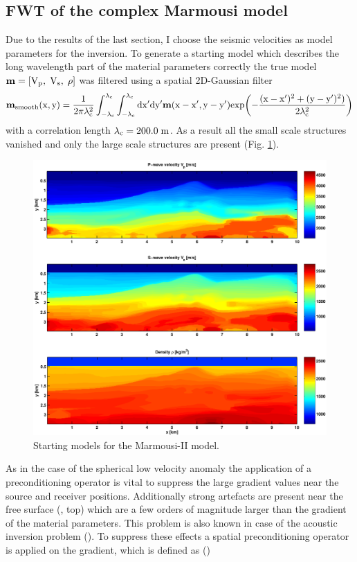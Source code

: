 \subsection{FWT of the complex Marmousi model}
\label{marmousi_complex_FWT}   
Due to the results of the last section, I choose the seismic velocities as model parameters for the inversion. To generate a starting model which describes the long wavelength part of the material parameters correctly the true model $\rm{\mathbf{m}=[V_p,\;V_s,\;\rho]}$ was filtered using a spatial 2D-Gaussian filter 
\begin{equation}
\rm{\mathbf{m}_{smooth}(x,y) = \frac{1}{2 \pi \lambda_c^2} \int_{-\lambda_c}^{\lambda_c} \int_{-\lambda_c}^{\lambda_c} dx' dy' \mathbf{m}(x-x',y-y') exp\biggl(-\frac{(x-x')^2+(y-y')^2)}{2 \lambda_c^2}\biggr)}
\label{gaussian}
\end{equation}
with a correlation length $\rm{\lambda_c = 200.0\;m}$. As a result all the small scale structures vanished and only the large scale structures are present (Fig. \ref{marmousi_II_start}). 
\begin{figure}[!bth]
\begin{center}
\includegraphics[width=12cm]{figures/marmousi/marmousi_II_start.pdf}
\caption{Starting models for the Marmousi-II model.}
\label{marmousi_II_start}
\end{center}
\end{figure}
\clearpage
As in the case of the spherical low velocity anomaly the application of a preconditioning operator is vital to suppress the large gradient values near the source and receiver positions. Additionally strong artefacts are present near the free surface (, top) which are a few orders of magnitude larger than the gradient of the material parameters. This problem is also known in case of the acoustic inversion problem (\cite{benhadj:2008}).  To suppress these effects a spatial preconditioning operator is applied on the gradient, which is defined as ()
